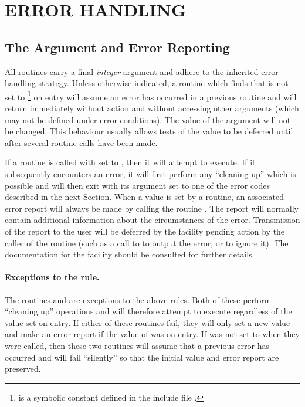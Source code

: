 \newpage
\section {ERROR HANDLING}

\label{appendix:error}


\subsection{ The  Argument and Error Reporting}

All  routines carry a final {\em integer} 
argument and adhere to the  inherited error handling strategy. 
Unless otherwise indicated, a routine which finds that  is
not set to \footnote{
 is a symbolic constant defined in the include file 
.
}
on entry will assume an error has occurred in a previous routine and will
return immediately without action and without accessing other arguments
(which may not be defined under error conditions). 
The value of the  argument will not be changed.
This behaviour usually allows tests of the  value to be
deferred until after several routine calls have been made. 

If a  routine is called with  set to 
, then it will attempt to execute.
If it subsequently encounters an error, it will first perform any ``cleaning
up'' which is possible and will then exit with its  argument
set to one of the error codes described in the next Section.
When a  value is set by a  routine, an
associated error report will always be made by calling the 
routine . 
The report will normally contain additional information about the
circumstances of the error. 
Transmission of the report to the user will be deferred by the 
facility pending action by the caller of the  routine
(such as a call to  to output the error, or
 to ignore it).
The documentation for the  facility should be consulted for
further details. 

\paragraph{Exceptions to the rule.}
The routines  and  are exceptions to the 
above rules.
Both of these perform ``cleaning up'' operations and will therefore attempt
to execute regardless of the  value set on entry. 
If either of these routines fail, they will only set a new 
value and make an error report if the value of  was
 on entry. 
If  was not set to  when they were called,
then these two routines will assume that a previous error has occurred and
will fail ``silently'' so that the initial  value and error
report are preserved. 


